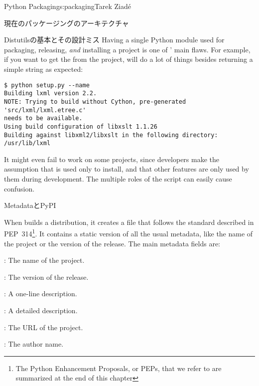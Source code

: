 \begin{aosachapter}{Python Packaging}{s:packaging}{Tarek Ziad\'{e}}
\begin{aosasect1}{現在のパッケージングのアーキテクチャ}
\begin{aosasect2}{Distutilsの基本とその設計ミス}
Having a single Python module used for packaging, releasing,
\emph{and} installing a project is one of ' main
flaws.  For example, if you want to get the  from the 
project,  will do a lot of things besides returning a
simple string as expected:

\begin{verbatim}
$ python setup.py --name
Building lxml version 2.2.
NOTE: Trying to build without Cython, pre-generated 'src/lxml/lxml.etree.c'
needs to be available.
Using build configuration of libxslt 1.1.26
Building against libxml2/libxslt in the following directory: /usr/lib/lxml
\end{verbatim}

\noindent It might even fail to work on some projects, since
developers make the assumption that  is used only to
install, and that other  features are only used by
them during development.  The multiple roles of the 
script can easily cause confusion.

\end{aosasect2}

\begin{aosasect2}{MetadataとPyPI}

When  builds a distribution, it creates a
 file that follows the standard described in
PEP~314\footnote{The Python Enhancement Proposals, or PEPs, that we
refer to are summarized at the end of this chapter}.  It contains a
static version of all the usual metadata, like the name of the project
or the version of the release.  The main metadata fields are:

\begin{aosaitemize}

  \item {}: The name of the project.

  \item {}: The version of the release.

  \item {}: A one-line description.

  \item {}: A detailed description.

  \item {}: The URL of the project.

  \item {}: The author name.


\end{aosaitemize}
\end{aosasect2}
\end{aosasect1}
\end{aosachapter}
